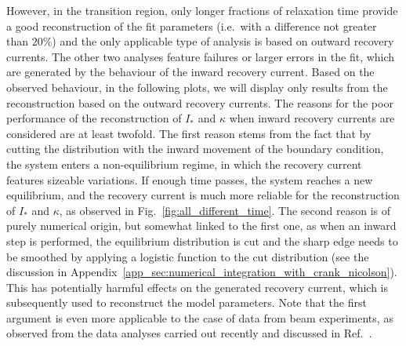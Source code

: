 However, in the transition region, only longer fractions of relaxation time provide a good reconstruction of the fit parameters  {(i.e.\ with a difference not greater than $20\%$)} and the only applicable type of analysis is based on outward recovery currents. The other two analyses feature failures or larger errors in the fit, {which are generated by the behaviour of the inward recovery current}. Based on the observed behaviour, in the following plots, we will display only results from the reconstruction based on the outward recovery currents. {The reasons for the poor performance of the reconstruction of $I_\ast$ and $\kappa$ when inward recovery currents are considered are at least twofold. The first reason stems from the fact that by cutting the distribution with the inward movement of the boundary condition, the system enters a non-equilibrium regime, in which the recovery current features sizeable variations. If enough time passes, the system reaches a new equilibrium, and the recovery current is much more reliable for the reconstruction of $I_\ast$ and $\kappa$, as observed in Fig.~\ref{fig:all_different_time}. The second reason is of purely numerical origin, but somewhat linked to the first one, as when an inward step is performed, the equilibrium distribution is cut and the sharp edge needs to be smoothed by applying a logistic function to the cut distribution (see the discussion in Appendix~\ref{app_sec:numerical_integration_with_crank_nicolson}). This has potentially harmful effects on the generated recovery current, which is subsequently used to reconstruct the model parameters. Note that the first argument is even more applicable to the case of data from beam experiments, as observed from the data analyses carried out recently and discussed in Ref.~\cite{montanari:ipac22-mopost043}.}

